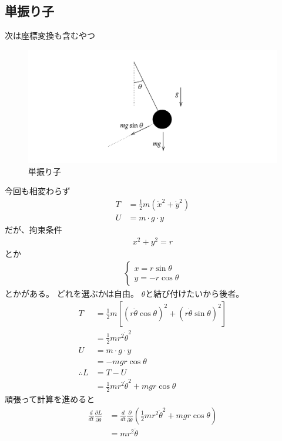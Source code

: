 \documentclass[a4paper,11pt]{jsarticle}
\begin{document}
\subsection{単振り子}

次は座標変換も含むやつ
\begin{figure}[t]
  \centering
  \includegraphics[width = 1\textwidth]{20210514_Single_Pendulumpng.png}
  \caption{単振り子}
  \label{}
\end{figure}
今回も相変わらず
\begin{align*}
  T &= \frac{1}{2}m\left(\dot{x}^2 + \dot{y}^2\right)
  \\ U & = m\cdot g\cdot y
\end{align*}
だが、拘束条件
\begin{align*}
  x^2 + y^2 = r
\end{align*}
とか
\begin{align*}
  \begin{cases}
    x = r\sin\theta \\
    y = -r\cos\theta
  \end{cases}
\end{align*}
とかがある。
どれを選ぶかは自由。
$\theta$と結び付けたいから後者。
\begin{align*}
  T &= \frac{1}{2}m\left[(r\dot{\theta}\cos\theta)^2 + (r\dot{\theta}\sin\theta)^2\right]
  \\ &= \frac{1}{2}mr^2\dot{\theta}^2
  \\ U & = m\cdot g\cdot y
  \\ &= -mgr\cos\theta
  \\ \therefore L &= T - U
  \\ &= \frac{1}{2}mr^2\dot{\theta}^2 + mgr\cos\theta
\end{align*}
頑張って計算を進めると
\begin{align*}
  \frac{d}{dt}\frac{\partial L}{\partial \dot{\theta}} 
  &= \frac{d}{dt}\frac{\partial }{\partial \dot{\theta}}\left(\frac{1}{2}mr^2\dot{\theta}^2 + mgr\cos\theta\right)
  \\ &= mr^2\ddot{\theta}
\end{align*}
\end{document}
